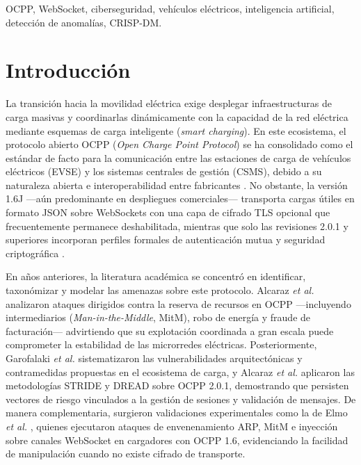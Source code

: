 \documentclass[conference]{IEEEtran}
\begin{document}
\begin{IEEEkeywords}
OCPP, WebSocket, ciberseguridad, vehículos eléctricos, inteligencia artificial, detección de anomalías, CRISP-DM.
\end{IEEEkeywords}

\section{Introducción}

La transición hacia la movilidad eléctrica exige desplegar infraestructuras de carga masivas y coordinarlas dinámicamente con la capacidad de la red eléctrica mediante esquemas de carga inteligente (\textit{smart charging}). En este ecosistema, el protocolo abierto OCPP (\textit{Open Charge Point Protocol}) se ha consolidado como el estándar de facto para la comunicación entre las estaciones de carga de vehículos eléctricos (EVSE) y los sistemas centrales de gestión (CSMS), debido a su naturaleza abierta e interoperabilidad entre fabricantes \cite{garofalaki2022}. No obstante, la versión 1.6J ---aún predominante en despliegues comerciales--- transporta cargas útiles en formato JSON sobre WebSockets con una capa de cifrado TLS opcional que frecuentemente permanece deshabilitada, mientras que solo las revisiones 2.0.1 y superiores incorporan perfiles formales de autenticación mutua y seguridad criptográfica \cite{garofalaki2022,alcaraz2023}.

En años anteriores, la literatura académica se concentró en identificar, taxonómizar y modelar las amenazas sobre este protocolo. Alcaraz \textit{et al.} \cite{alcaraz2017} analizaron ataques dirigidos contra la reserva de recursos en OCPP ---incluyendo intermediarios (\textit{Man-in-the-Middle}, MitM), robo de energía y fraude de facturación--- advirtiendo que su explotación coordinada a gran escala puede comprometer la estabilidad de las microrredes eléctricas. Posteriormente, Garofalaki \textit{et al.} \cite{garofalaki2022} sistematizaron las vulnerabilidades arquitectónicas y contramedidas propuestas en el ecosistema de carga, y Alcaraz \textit{et al.} \cite{alcaraz2023} aplicaron las metodologías STRIDE y DREAD sobre OCPP 2.0.1, demostrando que persisten vectores de riesgo vinculados a la gestión de sesiones y validación de mensajes. De manera complementaria, surgieron validaciones experimentales como la de Elmo \textit{et al.} \cite{elmo2023}, quienes ejecutaron ataques de envenenamiento ARP, MitM e inyección sobre canales WebSocket en cargadores con OCPP 1.6, evidenciando la facilidad de manipulación cuando no existe cifrado de transporte.
\end{document}
